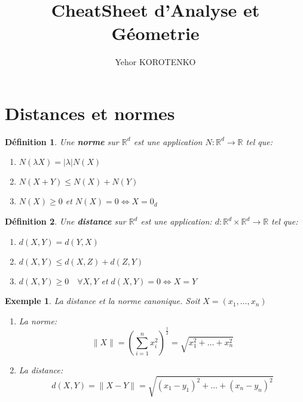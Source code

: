 \documentclass[a4paper]{article}
\title{CheatSheet d'Analyse et Géometrie}
\author{Yehor KOROTENKO}
\newcommand{\R}{\mathbb{R}}
\newtheorem{definition}{Définition}[section]
\newtheorem{exemple}{Exemple}[section]
\begin{document}
\maketitle
\section{Distances et normes}
   \begin{definition}
       Une \textbf{norme} sur $\R^d$ est une application $N: \R^d \to \R$ tel que:
       \begin{enumerate}
           \item $N(\lambda X) = |\lambda|N(X)$
           \item  $N(X + Y) \le N(X) + N(Y)$
           \item $N(X) \ge 0$ et $N(X) = 0 \iff X = 0_d$
       \end{enumerate}
   \end{definition} 
   \begin{definition}
       Une \textbf{distance} sur $\R^d$ est une application:  $d: \R^d \times \R^d \to \R$ tel que:
       \begin{enumerate}
           \item $d(X, Y) = d(Y, X)$
           \item  $d(X, Y) \le d(X, Z) + d(Z, Y)$
           \item $d(X, Y) \ge 0 \quad \forall X,Y$ et $d(X,Y) = 0 \iff X = Y$
       \end{enumerate}
   \end{definition}
   \begin{exemple} La distance et la norme canonique. Soit $X = (x_1, \ldots, x_n)$
      \begin{enumerate}
          \item La norme:
            \[
                \|X\| = \left( \sum_{i=1}^{n} x_i^2 \right)^{\frac{1}{2}}  = \sqrt{x_1^2 + \ldots + x_n^2} 
            \]               
        \item La distance: 
            \[
                d(X, Y) = \|X - Y\| = \sqrt{(x_1 - y_1)^2 + \ldots + (x_n - y_n)^2 } 
            \] 

      \end{enumerate} 
   \end{exemple}
\end{document}
